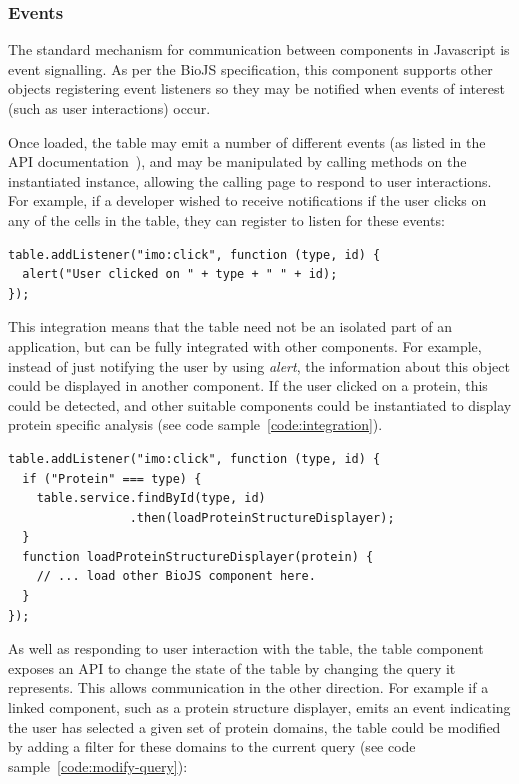 \documentclass[10pt,a4paper,twocolumn]{article}
\begin{document}
\subsubsection*{Events}

The standard mechanism for communication between components in Javascript is
event signalling. As per the BioJS specification, this component supports other
objects registering event listeners so they may be notified when events of
interest (such as user interactions) occur.

Once loaded, the table may emit a number of different events (as listed in the
API documentation~\cite{site:biojs-doc}), and may be manipulated by calling 
methods on the instantiated instance, allowing the calling page to respond to 
user interactions. For example, if a developer wished to receive notifications 
if the user clicks on any of the cells in the table, they can register to 
listen for these events:

\begin{lstlisting}[caption={Adding an Event Listener}, label={code:add-listener}]
table.addListener("imo:click", function (type, id) {
  alert("User clicked on " + type + " " + id);
});
\end{lstlisting}

This integration means that the table need not be an isolated part of an
application, but can be fully integrated with other components. For example,
instead of just notifying the user by using \emph{alert}, the information about
this object could be displayed in another component. If the user clicked on a
protein, this could be detected, and other suitable components could be
instantiated to display protein specific analysis (see code
sample~\ref{code:integration}).

\begin{lstlisting}[caption={Integrating with Other Components - Example 1}, label={code:integration}]
table.addListener("imo:click", function (type, id) {
  if ("Protein" === type) {
    table.service.findById(type, id)
                 .then(loadProteinStructureDisplayer);
  }
  function loadProteinStructureDisplayer(protein) {
    // ... load other BioJS component here.
  }
});
\end{lstlisting}

As well as responding to user interaction with the table, the table component
exposes an API to change the state of the table by changing the query it
represents. This allows communication in the other direction. For example if a
linked component, such as a protein structure displayer, emits an event
indicating the user has selected a given set of protein domains, the table could
be modified by adding a filter for these domains to the current query (see code
sample~\ref{code:modify-query}):
\end{document}
